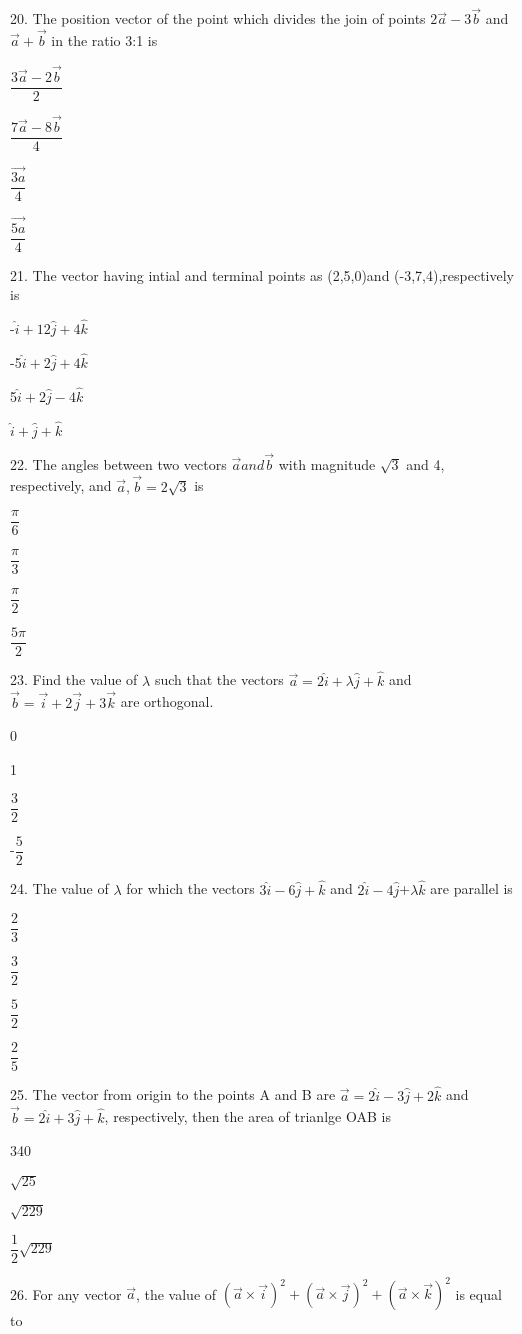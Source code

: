 \documentclass{article}
\newcommand{\choice}{\item}
\begin{document}
20. The position vector of the point which divides the join of points $2\overrightarrow{a}-3\overrightarrow{b}$ and $\overrightarrow{a}+\overrightarrow{b}$ in the ratio 3:1 is
\begin{choices}[fourcol]
\choice $\dfrac{3\overrightarrow{a}-2\overrightarrow{b}}{2}$
\choice $\dfrac{7\overrightarrow{a}-8\overrightarrow{b}}{4}$
\choice $\dfrac{\overrightarrow{3a}}{4}$	
\choice $\dfrac{\overrightarrow{5a}}{4}$
\end{choices}
21. The vector having intial and terminal points as (2,5,0)and (-3,7,4),respectively is 
\begin{choices}[twocol]
\choice -$\hat{i}+12\hat{j}+4\hat{k}$
\choice -5$\hat{i}+2\hat{j}+4\hat{k}$
\choice 5$\hat{i}+ 2\hat{j}-4\hat{k}$
\choice $\hat{i}+\hat{j}+\hat{k}$
\end{choices}
22. The angles between two vectors $\overrightarrow{a} and \overrightarrow{b}$ with magnitude $\sqrt{3}$ and 4, respectively, and $\overrightarrow{a},\overrightarrow{b}=2\sqrt{3}$ is
\begin{choices}[fourcol]
\choice $\dfrac{\pi}{6}$ 
\choice $\dfrac{\pi}{3}$
\choice $\dfrac{\pi}{2}$
\choice $\dfrac{5\pi}{2}$
\end{choices}
23. Find the value of $\lambda$ such that the vectors $\overrightarrow{a}=2\hat{i}+\lambda\hat{j}+\hat{k}$ and $\overrightarrow{b}=\overrightarrow{i}+2\overrightarrow{j}+3\overrightarrow{k}$ are orthogonal.
\begin{choices}[fourcol]
\choice 0
\choice 1
\choice $\dfrac{3}{2}$
\choice -$\dfrac{5}{2}$
\end{choices}
24. The value of $\lambda$ for which the vectors $3\hat{i}-6\hat{j}+\hat{k}$ and $2\hat{i}-4\hat{j}$+$\lambda\hat{k}$ are parallel is
\begin{choices}[fourcol]
\choice $\dfrac{2}{3}$
\choice $\dfrac{3}{2}$
\choice $\dfrac{5}{2}$
\choice $\dfrac{2}{5}$
\end{choices}
25. The vector from origin to the points A and B are $\overrightarrow{a}=2\hat{i}-3\hat{j}+2\hat{k}$ and $\overrightarrow{b}=2\hat{i}+3\hat{j}+\hat{k}$, respectively, then the area of trianlge OAB is
\begin{choices}[fourcol]
\choice 340
\choice $\sqrt{25}$
\choice $\sqrt{229}$	
\choice $\dfrac{1}{2}\sqrt{229}$
\end{choices}
26. For any vector $\overrightarrow{a}$, the value of $(\overrightarrow{a}\times\overrightarrow{i})^2+(\overrightarrow{a}\times\overrightarrow{j})^2 +(\overrightarrow{a}\times\overrightarrow{k})^2$ is equal to 
\end{document}
